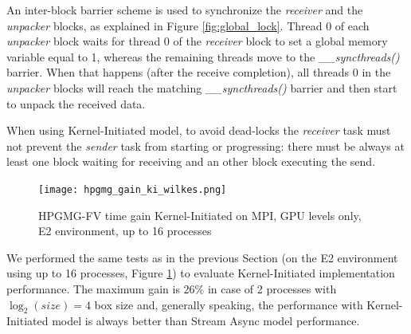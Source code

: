 \documentclass[review]{siamart1116}
\begin{document}
An inter-block barrier scheme is used to synchronize the \textit{receiver}
and the \textit{unpacker} blocks, as explained in Figure
\ref{fig:global_lock}. Thread 0 of each \textit{unpacker}
block waits for thread 0 of the
\textit{receiver} block to set a global memory variable equal to 1, whereas the
remaining threads move to the \textit{\_\_syncthreads()} barrier.
%
When that happens (after the receive completion), all threads 0 in the
\textit{unpacker} blocks will reach the matching \textit{\_\_syncthreads()}
barrier and then start to unpack the received data.







When using Kernel-Initiated model, to avoid dead-locks the \textit{receiver}
task must not prevent the \textit{sender} task from starting or
progressing: there must be always at least one block waiting for receiving and an other block executing the send.

\begin{figure}[h]
\centering
\texttt{[image: hpgmg\_gain\_ki\_wilkes.png]}
\caption{HPGMG-FV time gain Kernel-Initiated on MPI, GPU levels only, E2 environment, up to 16 processes}
\label{fig:hpgmg_gain_ki_wilkes}
\end{figure}

We performed the same tests as in the previous Section (on the E2 environment using up to 16 processes, Figure \ref{fig:hpgmg_gain_ki_wilkes}) to evaluate Kernel-Initiated implementation performance. The maximum gain is 26\% in case of 2 processes with $\log_2(size)=4$ box size and, generally speaking, the performance with Kernel-Initiated model is always better than Stream Async model performance.

\end{document}
